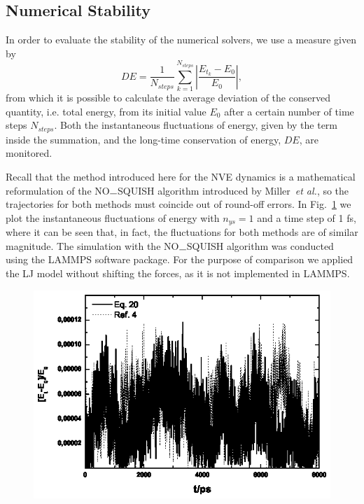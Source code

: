 \documentclass[aip,jcp,reprint,amsmath,amssymb,raggedbottom]{revtex4-1}
\begin{document}
\subsection{Numerical Stability}
\label{sec:performance}

In order to evaluate the stability of the numerical solvers, we use a measure given by
\begin{equation}
\label{eq:performance}
D E =  \frac{1}{N_{steps}} \sum_{k=1}^{N_{steps}} \left| \frac{E_{t_k} - E_0}{E_0} \right|,
\end{equation}
from which it is possible to calculate the average deviation of the conserved quantity, i.e. total energy, from its initial value $E_0$ after a certain number of time steps $N_{steps}$. Both the instantaneous fluctuations of energy, given by the term inside the summation, and the long-time conservation of energy, $D E$, are monitored.  

Recall that the method introduced here for the NVE dynamics is a mathematical reformulation of the NO$\rule{0.25cm}{0.15mm}$SQUISH algorithm introduced by Miller~\textit{et al.}\cite{Miller2002}, so the trajectories for both methods must coincide out of round-off errors. In Fig.~\ref{fig:miller1fs} we plot the instantaneous fluctuations of energy with $n_{ys} = 1 $ and a time step of 1 fs, where it can be seen that, in fact, the fluctuations for both methods are of similar magnitude. The simulation with the NO$\rule{0.25cm}{0.15mm}$SQUISH algorithm was conducted using the LAMMPS\cite{Plimpton1995} software package. For the purpose of comparison we applied the LJ model without shifting the forces, as it is not implemented in LAMMPS.

\begin{figure}[!h]
\centering
\includegraphics{millerourmd}
\label{fig:miller1fs}
\end{figure}
\end{document}
